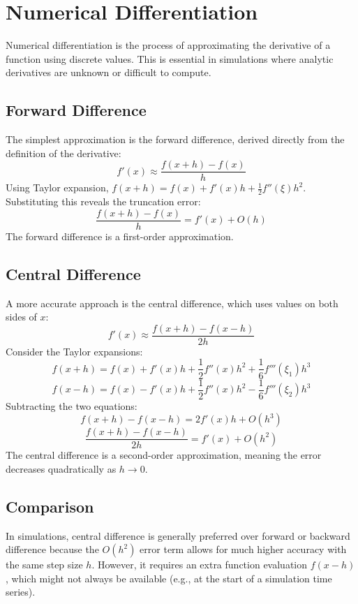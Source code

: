 \appendix
\section*{Numerical Differentiation}

Numerical differentiation is the process of approximating the derivative of a function using discrete values. This is essential in simulations where analytic derivatives are unknown or difficult to compute.

\subsection*{Forward Difference}

The simplest approximation is the forward difference, derived directly from the definition of the derivative:
\[
f'(x) \approx \frac{f(x+h) - f(x)}{h}
\]
Using Taylor expansion, $f(x+h) = f(x) + f'(x)h + \frac{1}{2}f''(\xi)h^2$. Substituting this reveals the truncation error:
\[
\frac{f(x+h) - f(x)}{h} = f'(x) + O(h)
\]
The forward difference is a first-order approximation.

\subsection*{Central Difference}

A more accurate approach is the central difference, which uses values on both sides of $x$:
\[
f'(x) \approx \frac{f(x+h) - f(x-h)}{2h}
\]
Consider the Taylor expansions:
\[
f(x+h) = f(x) + f'(x)h + \frac{1}{2}f''(x)h^2 + \frac{1}{6}f'''(\xi_1)h^3
\]
\[
f(x-h) = f(x) - f'(x)h + \frac{1}{2}f''(x)h^2 - \frac{1}{6}f'''(\xi_2)h^3
\]
Subtracting the two equations:
\[
f(x+h) - f(x-h) = 2f'(x)h + O(h^3)
\]
\[
\frac{f(x+h) - f(x-h)}{2h} = f'(x) + O(h^2)
\]
The central difference is a second-order approximation, meaning the error decreases quadratically as $h \to 0$.

\subsection*{Comparison}

In simulations, central difference is generally preferred over forward or backward difference because the $O(h^2)$ error term allows for much higher accuracy with the same step size $h$. However, it requires an extra function evaluation $f(x-h)$, which might not always be available (e.g., at the start of a simulation time series).
